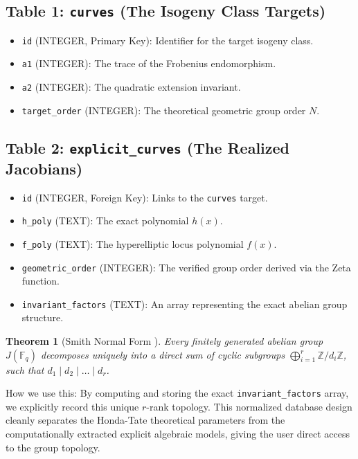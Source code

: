 \documentclass[letterpaper, 11pt]{article}
\newtheorem{theorem}{Theorem}[section]
\begin{document}
\subsection{Table 1: \texttt{curves} (The Isogeny Class Targets)}
\begin{itemize}
    \item \texttt{id} (INTEGER, Primary Key): Identifier for the target isogeny class.
    \item \texttt{a1} (INTEGER): The trace of the Frobenius endomorphism.
    \item \texttt{a2} (INTEGER): The quadratic extension invariant.
    \item \texttt{target\_order} (INTEGER): The theoretical geometric group order $N$.
\end{itemize}

\subsection{Table 2: \texttt{explicit\_curves} (The Realized Jacobians)}
\begin{itemize}
    \item \texttt{id} (INTEGER, Foreign Key): Links to the \texttt{curves} target.
    \item \texttt{h\_poly} (TEXT): The exact polynomial $h(x)$.
    \item \texttt{f\_poly} (TEXT): The hyperelliptic locus polynomial $f(x)$.
    \item \texttt{geometric\_order} (INTEGER): The verified group order derived via the Zeta function.
    \item \texttt{invariant\_factors} (TEXT): An array representing the exact abelian group structure.
\end{itemize}

\begin{theorem}[Smith Normal Form \cite{Smith1861}]
Every finitely generated abelian group $J(\mathbb{F}_q)$ decomposes uniquely into a direct sum of cyclic subgroups $\bigoplus_{i=1}^r \mathbb{Z}/d_i\mathbb{Z}$, such that $d_1 \mid d_2 \mid \dots \mid d_r$.
\end{theorem}

How we use this: By computing and storing the exact \texttt{invariant\_factors} array, we explicitly record this unique $r$-rank topology. This normalized database design cleanly separates the Honda-Tate theoretical parameters from the computationally extracted explicit algebraic models, giving the user direct access to the group topology.
\end{document}
